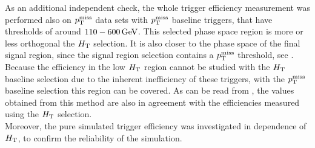 As an additional independent check, the whole trigger efficiency measurement was performed also on $p_{\mathrm{T}}^\text{miss}$ data sets with $p_{\mathrm{T}}^\text{miss}$ baseline triggers, that have thresholds of around $110-600\,\text{Ge\hspace{-.08em}V}$. This selected phase space region is more or less orthogonal the $H_{\mathrm{T}}$ selection. It is also closer to the phase space of the final signal region, since the signal region selection contains a $p_{\mathrm{T}}^\text{miss}$ threshold, see . Because the efficiency in the low $H_{\mathrm{T}}$ region cannot be studied with the $H_{\mathrm{T}}$ baseline selection due to the inherent inefficiency of these triggers, with the $p_{\mathrm{T}}^\text{miss}$ baseline selection this region can be covered. As can be read from , the values obtained from this method are also in agreement with the efficiencies measured using the $H_{\mathrm{T}}$ selection.\\
Moreover, the pure simulated trigger efficiency was investigated in dependence of $H_{\mathrm{T}}$, to confirm the reliability of the simulation.
